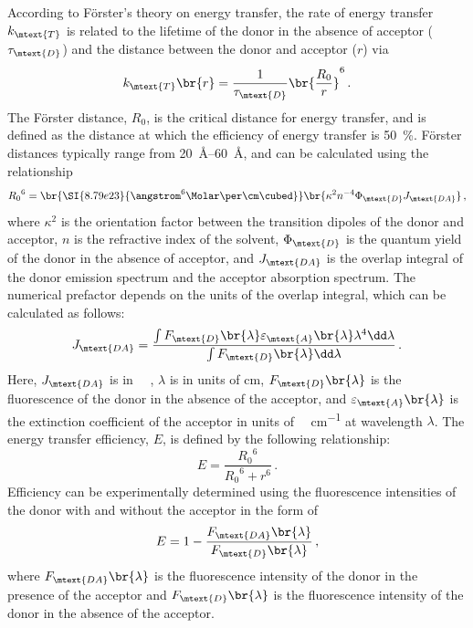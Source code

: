 According to Förster’s theory on energy transfer, the rate of energy transfer \( k_\mtext{T} \) is related to the lifetime of the donor in the absence of acceptor (\( \tau_\mtext{D} \)) and the distance between the donor and acceptor (\( r \)) via
\begin{equation}
	k_\mtext{T}\br{r} = \frac{1}{\tau_\mtext{D}} \br{\frac{R_0}{r}}^6 \, .
\end{equation}
The Förster distance, \( R_0 \), is the critical distance for energy transfer, and is defined as the distance at which the efficiency of energy transfer is \SI{50}{\percent}. 
Förster distances typically range from \SIrange{20}{60}{\angstrom}, and can be calculated using the relationship
\begin{equation}
	{R_0}^6 = \br{\SI{8.79e23}{\angstrom^6\Molar\per\cm\cubed}}
							\br{\kappa^2 n^{-4} \Phi_\mtext{D} J_\mtext{DA}} \, ,
  \label{eq:forster_dist}
\end{equation}
where \( \kappa^2 \) is the orientation factor between the transition dipoles of the donor and acceptor, \( n \) is the refractive index of the solvent, \( \Phi_\mtext{D} \) is the quantum yield of the donor in the absence of acceptor, and \( J_\mtext{DA} \) is the overlap integral of the donor emission spectrum and the acceptor absorption spectrum. 
The numerical prefactor depends on the units of the overlap integral, which can be calculated as follows:
\begin{equation}
	J_\mtext{DA} = \frac{\int F_\mtext{D}\br{\lambda}
											 \varepsilon_\mtext{A}\br{\lambda} 
											 \lambda^4 \dd\lambda}
											{\int F_\mtext{D}\br{\lambda}\dd\lambda} \, .
  \label{eq:overlap_int}
\end{equation}
Here, \( J_\mtext{DA} \) is in \si{\per\Molar\cmc}, \( \lambda \) is in units of \si{\cm}, \( F_\mtext{D}\br{\lambda} \) is the fluorescence of the donor in the absence of the acceptor, and \( \varepsilon_\mtext{A}\br{\lambda} \) is the extinction coefficient of the acceptor in units of \si{\per\Molar\per\cm} at wavelength \( \lambda \). The energy transfer efficiency, \( E \), is defined by the following relationship:
\begin{equation}
	E = \frac{{R_0}^6}{{R_0}^6 + r^6} \, .
	\label{eq:dist_efficiency}
\end{equation}
Efficiency can be experimentally determined using the fluorescence intensities of the donor with and without the acceptor in the form of
\begin{equation}
	E = 1 - \frac{F_\mtext{DA}\br{\lambda}}{F_\mtext{D}\br{\lambda}} \, ,
	\label{eq:spec_efficiency}
\end{equation}
where \( F_\mtext{DA}\br{\lambda} \) is the fluorescence intensity of the donor in the presence of the acceptor and \( F_\mtext{D}\br{\lambda} \) is the fluorescence intensity of the donor in the absence of the acceptor. 

